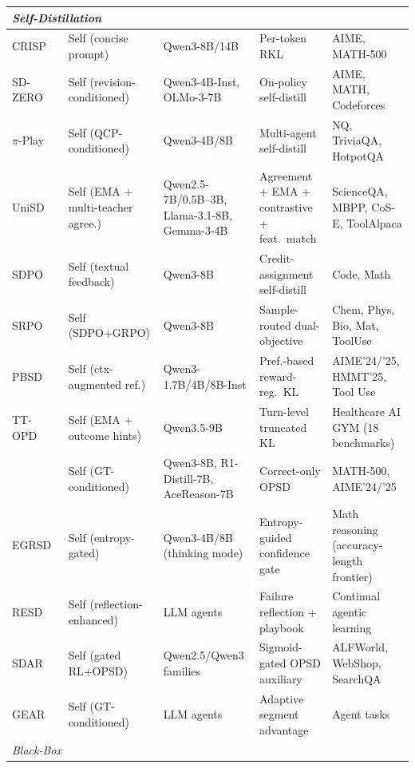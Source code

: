 \documentclass{article} %
\begin{document}
\begin{table}[t]
{\begin{tabular}{@{}lllll@{}}
        \midrule
        \multicolumn{5}{l}{\textit{Self-Distillation}} \\
        \midrule
        CRISP~\citep{2603.05433} & Self (concise prompt) & Qwen3-8B/14B & Per-token RKL & AIME, MATH-500 \\
        SD-ZERO~\citep{2604.12002} & Self (revision-conditioned) & Qwen3-4B-Inst, OLMo-3-7B & On-policy self-distill & AIME, MATH, Codeforces \\
        $\pi$-Play~\citep{2604.14054} & Self (QCP-conditioned) & Qwen3-4B/8B & Multi-agent self-distill & NQ, TriviaQA, HotpotQA \\
        UniSD~\citep{2605.06597} & Self (EMA + multi-teacher agree.) & Qwen2.5-7B/0.5B--3B, Llama-3.1-8B, Gemma-3-4B & Agreement + EMA + contrastive + feat.~match & ScienceQA, MBPP, CoS-E, ToolAlpaca \\
        SDPO~\citep{2601.20802} & Self (textual feedback) & Qwen3-8B & Credit-assignment self-distill & Code, Math \\
        SRPO~\citep{2604.02288} & Self (SDPO+GRPO) & Qwen3-8B & Sample-routed dual-objective & Chem, Phys, Bio, Mat, ToolUse \\
        PBSD~\citep{2605.05040} & Self (ctx-augmented ref.) & Qwen3-1.7B/4B/8B-Inst & Pref.-based reward-reg.\ KL & AIME'24/'25, HMMT'25, Tool Use \\
        TT-OPD~\citep{2605.02943} & Self (EMA + outcome hints) & Qwen3.5-9B & Turn-level truncated KL & Healthcare AI GYM (18 benchmarks) \\
        \citet{2605.06188} & Self (GT-conditioned) & Qwen3-8B, R1-Distill-7B, AceReason-7B & Correct-only OPSD & MATH-500, AIME'24/'25 \\
        EGRSD~\citep{2605.13255} & Self (entropy-gated) & Qwen3-4B/8B (thinking mode) & Entropy-guided confidence gate & Math reasoning (accuracy-length frontier) \\
        RESD~\citep{2605.12741} & Self (reflection-enhanced) & LLM agents & Failure reflection + playbook & Continual agentic learning \\
        SDAR~\citep{2605.15155} & Self (gated RL+OPSD) & Qwen2.5/Qwen3 families & Sigmoid-gated OPSD auxiliary & ALFWorld, WebShop, SearchQA \\
        GEAR~\citep{2605.11853} & Self (GT-conditioned) & LLM agents & Adaptive segment advantage & Agent tasks \\
        \midrule
        \multicolumn{5}{l}{\textit{Black-Box}} \\
        \midrule

\end{tabular}}
\end{table}
\end{document}
